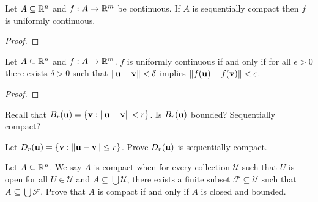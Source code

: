 \documentclass[letterpaper, twoside, 12pt]{book}
\begin{document}
\begin{theorem}[11.25, Exercise 5]
  Let \(A\subseteq\mathbb R^n\) and \(f:A\to\mathbb R^m\) be continuous.
  If \(A\) is sequentially compact then \(f\) is uniformly continuous.
\end{theorem}
\begin{proof}

\end{proof}

\begin{theorem}[11.27, Exercise 11]
  Let \(A\subseteq\mathbb R^n\) and \(f:A\to\mathbb R^m\).
  \(f\) is uniformly continuous if and only if for all \(\epsilon>0\)
  there exists \(\delta>0\) such that \(\|\mathbf u-\mathbf v\|<\delta\)
  implies \(\|f(\mathbf u)-f(\mathbf v)\|<\epsilon\).
\end{theorem}
\begin{proof}

\end{proof}

\begin{exercise}[3,4]
  Recall that \(B_r(\mathbf u)=\{\mathbf v:\|\mathbf u-\mathbf v\|<r\}\).
  Is \(B_r(\mathbf u)\) bounded? Sequentially compact?
\end{exercise}
\begin{solution}

\end{solution}

\begin{exercise}[2]
  Let \(D_r(\mathbf u)=\{\mathbf v:\|\mathbf u-\mathbf v\|\leq r\}\).
  Prove \(D_r(\mathbf u)\) is sequentially compact.
\end{exercise}
\begin{solution}

\end{solution}

\begin{exercise}
  Let \(A\subseteq\mathbb R^n\). We say \(A\) is compact when for every
  collection \(\mathcal U\) such that \(U\) is open
  for all \(U\in\mathcal U\) and \(A\subseteq\bigcup\mathcal U\), there exists
  a finite subset \(\mathcal F\subseteq\mathcal U\) such that
  \(A\subseteq\bigcup\mathcal F\). Prove that \(A\) is compact if and only if
  \(A\) is closed and bounded.
\end{exercise}
\begin{solution}

\end{solution}
\end{document}
